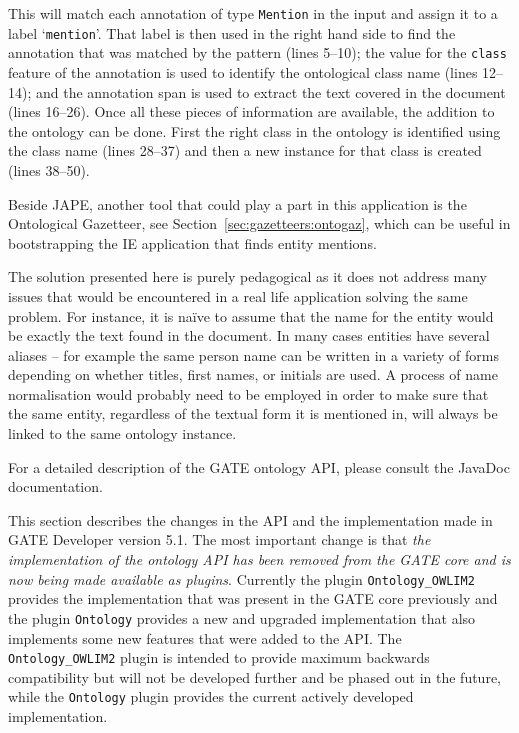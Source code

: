 {This will match each annotation of type {\tt Mention} in the input and
assign it to a label `{\tt mention}'. That label is then used in the right
hand side to find the annotation that was matched by the pattern (lines
5--10); the value for the {\tt class} feature of the annotation is used to
identify the ontological class name (lines 12--14); and the annotation span
is used to extract the text covered in the document (lines 16--26). Once all
these pieces of information are available, the addition to the ontology can
be done. First the right class in the ontology is identified using the class
name (lines 28--37) and then a new instance for that class is created (lines
38--50).

Beside JAPE, another tool that could play a part in this application is the
Ontological Gazetteer, see Section~\ref{sec:gazetteers:ontogaz}, which can be useful in 
bootstrapping the IE application that finds entity mentions.

The solution presented here is purely pedagogical as it does not address
many issues that would be encountered in a real life application solving the
same problem. For instance, it is na\"{i}ve to assume that the name for the
entity would be exactly the text found in the document. In many cases
entities have several aliases -- for example the same person name can be
written in a variety of forms depending on whether titles, first names, or
initials are used. A process of name normalisation would probably need to be
employed in order to make sure that the same entity, regardless of the
textual form it is mentioned in, will always be linked to the same ontology
instance.

For a detailed description of the GATE ontology API, please
consult the JavaDoc documentation.


This section describes the changes in the API and the implementation 
made in GATE Developer version 5.1. The most important change is that
\emph{the implementation of the ontology API has been removed from the 
GATE core and is now being made available as plugins}. Currently 
the plugin \texttt{Ontology\_OWLIM2} provides the implementation that
was present in the GATE core previously and the plugin \texttt{Ontology}
provides a new and upgraded implementation that also implements some
new features that were added to the API. The \texttt{Ontology\_OWLIM2} 
plugin is intended to provide maximum backwards compatibility but
will not be developed further and be phased out in the future, while 
the \texttt{Ontology} plugin provides the current actively developed
implementation. 

}
